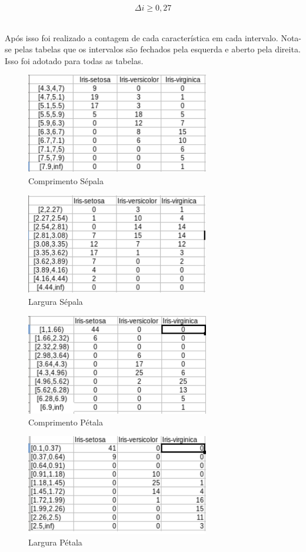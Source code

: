 \documentclass[a4paper, 12pt]{article}
\begin{document}
\begin{enumerate}
\begin{itemize}
\begin{description}
      $$\boxed{\Delta i \ge 0,27}$$
    \end{description} \\
    Após isso foi realizado a contagem de cada característica em cada intervalo. Nota-se pelas tabelas que os intervalos são fechados pela esquerda e aberto pela direita. Isso foi adotado para todas as tabelas.\\
  \begin{figure}[h!]
    \centering
    \includegraphics[width=80mm]{img2.png}
    \caption{Comprimento Sépala}
  \end{figure}
  \begin{figure}[h!]  
    \centering
    \includegraphics[width=80mm]{img3.png}
    \caption{Largura Sépala}
  \end{figure}
  \begin{figure}[h!]  
    \centering    
    \includegraphics[width=80mm]{img4.png}
    \caption{Comprimento Pétala}
  \end{figure}
  \begin{figure}[h!]  
    \centering
    \includegraphics[width=80mm]{img5.png}
    \caption{Largura Pétala}
  \end{figure}
  \\\\
  

\end{itemize}
\end{enumerate}
\end{document}
